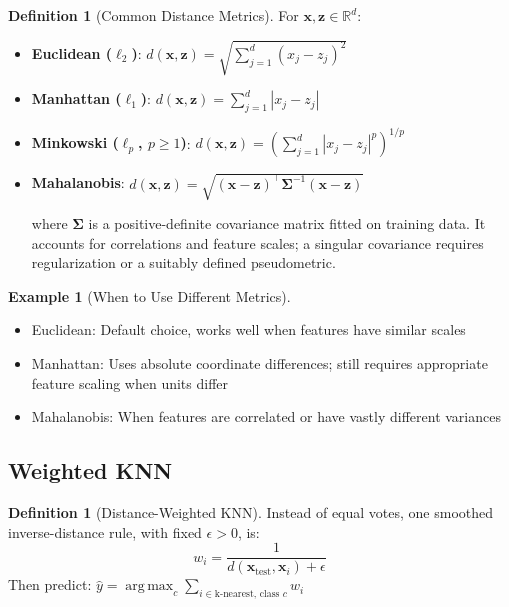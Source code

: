 \documentclass[11pt,twoside]{article}
\numberwithin{equation}{section}
\DeclareMathOperator*{\argmax}{arg\,max}
\newcommand{\R}{\mathbb{R}}
\newcommand{\vect}[1]{\bm{#1}}
\newcommand{\mat}[1]{\bm{#1}}
\theoremstyle{plain}
\theoremstyle{definition}
\newtheorem{definition}[theorem]{Definition}
\newtheorem{example}[theorem]{Example}
\theoremstyle{remark}
\begin{document}
\begin{definition}[Common Distance Metrics]
For $\vect{x}, \vect{z} \in \R^d$:

\begin{itemize}
\item \textbf{Euclidean ($\ell_2$)}: $d(\vect{x}, \vect{z}) = \sqrt{\sum_{j=1}^d (x_j - z_j)^2}$

\item \textbf{Manhattan ($\ell_1$)}: $d(\vect{x}, \vect{z}) = \sum_{j=1}^d |x_j - z_j|$

\item \textbf{Minkowski ($\ell_p$, $p\geq1$)}: $d(\vect{x}, \vect{z}) = \left(\sum_{j=1}^d |x_j - z_j|^p\right)^{1/p}$

\item \textbf{Mahalanobis}: $d(\vect{x}, \vect{z}) = \sqrt{(\vect{x}-\vect{z})^\top\mat{\Sigma}^{-1}(\vect{x}-\vect{z})}$

where $\mat{\Sigma}$ is a positive-definite covariance matrix fitted on training data. It accounts for correlations and feature scales; a singular covariance requires regularization or a suitably defined pseudometric.
\end{itemize}
\end{definition}

\begin{example}[When to Use Different Metrics]
\begin{itemize}
\item Euclidean: Default choice, works well when features have similar scales
\item Manhattan: Uses absolute coordinate differences; still requires appropriate feature scaling when units differ
\item Mahalanobis: When features are correlated or have vastly different variances
\end{itemize}
\end{example}

\subsection{Weighted KNN}

\begin{definition}[Distance-Weighted KNN]
Instead of equal votes, one smoothed inverse-distance rule, with fixed $\epsilon>0$, is:
\[
w_i = \frac{1}{d(\vect{x}_{\text{test}}, \vect{x}_i) + \epsilon}
\]
Then predict: $\hat{y} = \argmax_c \sum_{i \in \text{k-nearest, class } c} w_i$
\end{definition}
\end{document}
